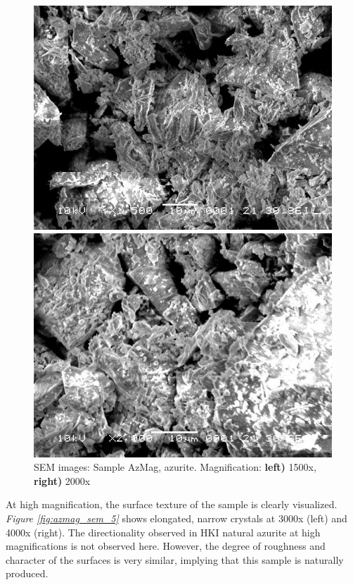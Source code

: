\begin{figure}[H]
\centering
\begin{minipage}{.45\textwidth}
  \centering
  \includegraphics[width=\linewidth]{AzMag_x1500_5_160321}
\end{minipage}
\begin{minipage}{.45\textwidth}
  \centering
  \includegraphics[width=\linewidth]{AzMag_x2000_1_160321}
\end{minipage}
\caption[SEM images: Sample AzMag, azurite]{SEM images: Sample AzMag, azurite. Magnification: \textbf{left)} 1500x, \textbf{right)} 2000x}
\label{fig:azmag_sem_4}
\end{figure}

At high magnification, the surface texture of the sample is clearly visualized. \textit{Figure \ref{fig:azmag_sem_5}} shows elongated, narrow crystals at 3000x (left) and 4000x (right). The directionality observed in HKI natural azurite at high magnifications is not observed here. However, the degree of roughness and character of the surfaces is very similar, implying that this sample is naturally produced.

